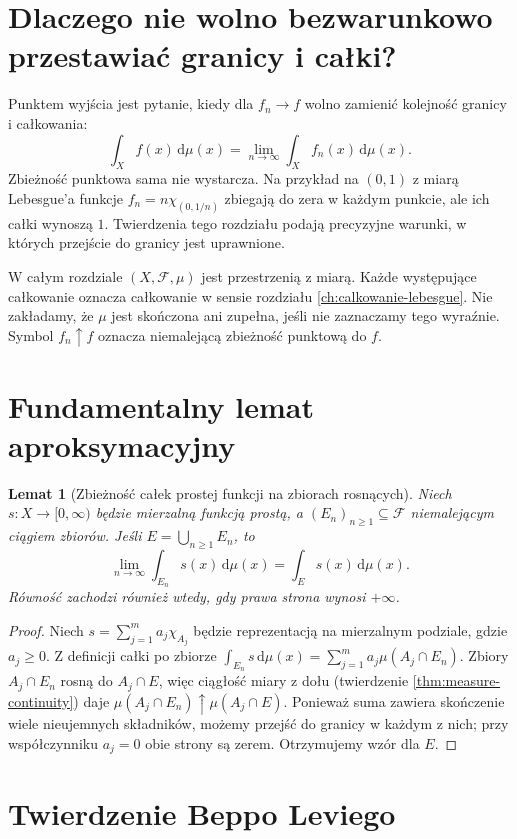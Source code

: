 \documentclass[11pt,a4paper,oneside]{book}
\numberwithin{equation}{chapter}
\theoremstyle{plain}
\newtheorem{lemat}[twierdzenie]{Lemat}
\theoremstyle{definition}
\theoremstyle{remark}
\begin{document}
\section{Dlaczego nie wolno bezwarunkowo przestawiać granicy i całki?}

Punktem wyjścia jest pytanie, kiedy dla $f_n\to f$ wolno
zamienić kolejność granicy i całkowania:
\[
\int_X f(x)\,\mathrm d\mu(x)
=\lim_{n\to\infty}\int_X f_n(x)\,\mathrm d\mu(x).
\]
Zbieżność punktowa sama nie wystarcza. Na przykład na
$(0,1)$ z miarą Lebesgue'a funkcje
$f_n=n\chi_{(0,1/n)}$ zbiegają do zera w każdym
punkcie, ale ich całki wynoszą $1$.
Twierdzenia tego rozdziału podają precyzyjne warunki,
w których przejście do granicy jest uprawnione.

W całym rozdziale $(X,\mathcal F,\mu)$ jest przestrzenią
z miarą. Każde występujące całkowanie oznacza całkowanie
w sensie rozdziału \ref{ch:calkowanie-lebesgue}.
Nie zakładamy, że $\mu$ jest skończona ani zupełna,
jeśli nie zaznaczamy tego wyraźnie. Symbol $f_n\uparrow f$
oznacza niemalejącą zbieżność punktową do $f$.

\section{Fundamentalny lemat aproksymacyjny}

\begin{lemat}[Zbieżność całek prostej funkcji na zbiorach rosnących]
\label{lem:simple-exhaustion}
Niech $s:X\to[0,\infty)$ będzie mierzalną funkcją
prostą, a $(E_n)_{n\ge1}\subseteq\mathcal F$
niemalejącym ciągiem zbiorów. Jeśli
$E=\bigcup_{n\ge1}E_n$, to
\[
\lim_{n\to\infty}\int_{E_n}s(x)\,\mathrm d\mu(x)
=\int_Es(x)\,\mathrm d\mu(x).
\]
Równość zachodzi również wtedy, gdy prawa strona
wynosi $+\infty$.
\end{lemat}
\begin{proof}
Niech $s=\sum_{j=1}^m a_j\chi_{A_j}$
będzie reprezentacją na mierzalnym podziale, gdzie
$a_j\ge0$. Z definicji całki po zbiorze
$\int_{E_n}s\,\mathrm d\mu(x)=
\sum_{j=1}^m a_j\mu(A_j\cap E_n)$.
Zbiory $A_j\cap E_n$ rosną do $A_j\cap E$, więc
ciągłość miary z dołu (twierdzenie
\ref{thm:measure-continuity}) daje
$\mu(A_j\cap E_n)\uparrow\mu(A_j\cap E)$.
Ponieważ suma zawiera skończenie wiele nieujemnych
składników, możemy przejść do granicy w każdym z nich;
przy współczynniku $a_j=0$ obie strony są zerem.
Otrzymujemy wzór dla $E$.
\end{proof}

\section{Twierdzenie Beppo Leviego}
\end{document}
